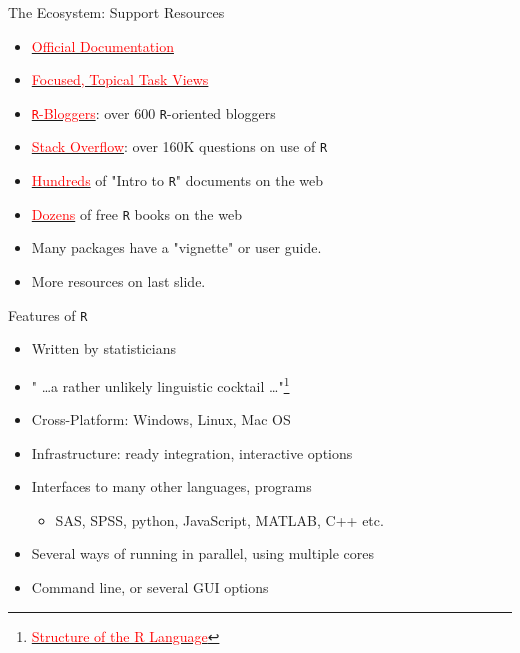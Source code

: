 \documentclass[aspectratio=169]{beamer}\usepackage[]{graphicx}\usepackage[]{color}
\begin{document}

\begin{frame}{The Ecosystem: Support Resources}
  \begin{itemize}
    \item \href{https://cran.r-project.org/manuals.html}{\textcolor{red}{Official Documentation}}
    \item \href{https://cran.r-project.org/web/views/}{\textcolor{red}{Focused, Topical Task Views}}
    \item \href{https://www.r-bloggers.com/}{\textcolor{red}{\texttt{R}-Bloggers}}: over 600 \texttt{R}-oriented bloggers
    \item \href{https://stackoverflow.com/questions/tagged/r}{\textcolor{red}{Stack Overflow}}: over 160K questions on use of \texttt{R}
    \item \href{https://stackoverflow.com/tags/r/info}{\textcolor{red}{Hundreds}} of "Intro to \texttt{R}" documents on the web
    \item \href{https://stackoverflow.com/tags/r/info}{\textcolor{red}{Dozens}} of free \texttt{R} books on the web
    \item Many packages have a "vignette" or user guide.
    \item More resources on last slide.
  \end{itemize}
\end{frame}


\begin{frame}{Features of \texttt{R}}
  \begin{itemize}
    \item Written by statisticians
    \item " \ldots a rather unlikely linguistic cocktail \ldots"\footnote{\href{http://r.cs.purdue.edu/pub/ecoop12.pdf}{\textcolor{red}{Structure of the R Language}}}
    \item Cross-Platform: Windows, Linux, Mac OS
    \item Infrastructure:  ready integration, interactive options
    \item Interfaces to many other languages, programs
      \begin{itemize}
        \item SAS, SPSS, python, JavaScript, MATLAB, C++ etc.
      \end{itemize}
    \item Several ways of running in parallel, using multiple cores
    \item Command line, or several GUI options
  \end{itemize}

\end{frame}
\end{document}
